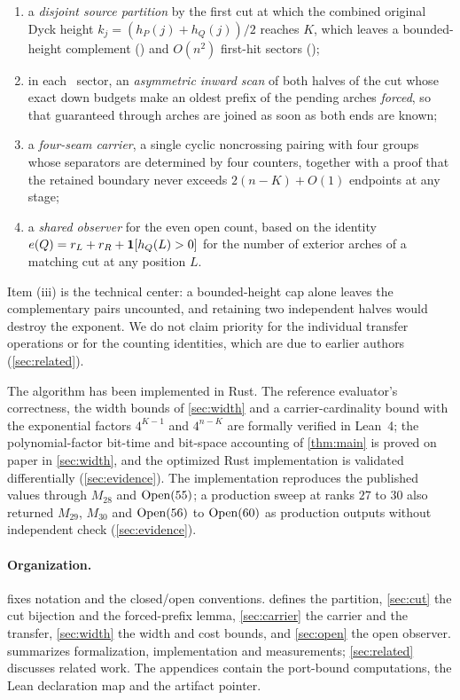 \begin{enumerate}[nosep,label=(\roman*)]
\item a \emph{disjoint source partition} by the first cut at which the combined
  original Dyck height $k_j=(h_P(j)+h_Q(j))/2$ reaches $K$, which leaves a
  bounded-height complement (\LOW) and $O(n^2)$ first-hit sectors (\HIGH);
\item in each \HIGH\ sector, an \emph{asymmetric inward scan} of both halves of
  the cut whose exact down budgets make an oldest prefix of the pending arches
  \emph{forced}, so that guaranteed through arches are joined as soon as both
  ends are known;
\item a \emph{four-seam carrier}, a single cyclic noncrossing pairing with four
  groups whose separators are determined by four counters, together with a proof
  that the retained boundary never exceeds $2(n-K)+O(1)$ endpoints at any stage;
\item a \emph{shared observer} for the even open count, based on the identity
  $e(Q)=r_L+r_R+\mathbf{1}[h_Q(L)>0]$ for the number of exterior arches of a matching
  cut at any position $L$.
\end{enumerate}

Item (iii) is the technical center: a bounded-height cap alone leaves the
complementary pairs uncounted, and retaining two independent halves would destroy
the exponent. We do not claim priority for the individual transfer operations or
for the counting identities, which are due to earlier authors
(\cref{sec:related}).

The algorithm has been implemented in Rust. The reference evaluator's
correctness, the width bounds of \cref{sec:width} and a carrier-cardinality
bound with the exponential factors $4^{K-1}$ and $4^{n-K}$ are formally
verified in Lean~4; the polynomial-factor bit-time and bit-space accounting
of \cref{thm:main} is proved on paper in \cref{sec:width}, and the optimized
Rust implementation is validated differentially (\cref{sec:evidence}). The
implementation reproduces the published values through $M_{28}$ and
$\operatorname{Open}(55)$; a production sweep at ranks $27$ to $30$ also returned
$M_{29}$, $M_{30}$ and $\operatorname{Open}(56)$ to $\operatorname{Open}(60)$ as production outputs
without independent check (\cref{sec:evidence}).

\paragraph{Organization.}
 fixes notation and the closed/open conventions.
 defines the partition, \cref{sec:cut} the cut bijection and
the forced-prefix lemma, \cref{sec:carrier} the carrier and the transfer,
\cref{sec:width} the width and cost bounds, and \cref{sec:open} the open
observer.  summarizes formalization, implementation and
measurements; \cref{sec:related} discusses related work. The appendices contain
the port-bound computations, the Lean declaration map and the artifact pointer.
